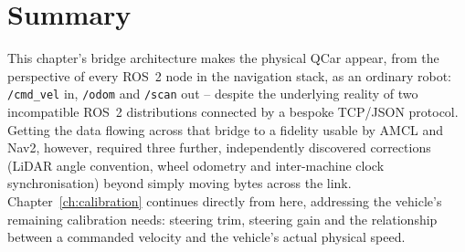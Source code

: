 \section{Summary}
\label{sec:hardware-bridge-summary}

This chapter's bridge architecture makes the physical QCar appear,
from the perspective of every ROS~2 node in the navigation stack, as
an ordinary robot: \texttt{/cmd\_vel} in, \texttt{/odom} and
\texttt{/scan} out -- despite the underlying reality of two incompatible ROS~2
distributions connected by a bespoke TCP/JSON protocol. Getting the
data flowing across that bridge to a fidelity usable by AMCL and
Nav2, however, required three further, independently discovered
corrections (LiDAR angle convention, wheel odometry
and inter-machine clock synchronisation) beyond simply moving bytes
across the link. Chapter~\ref{ch:calibration} continues directly from
here, addressing the vehicle's remaining calibration needs: steering
trim, steering gain and the relationship between a commanded
velocity and the vehicle's actual physical speed.
